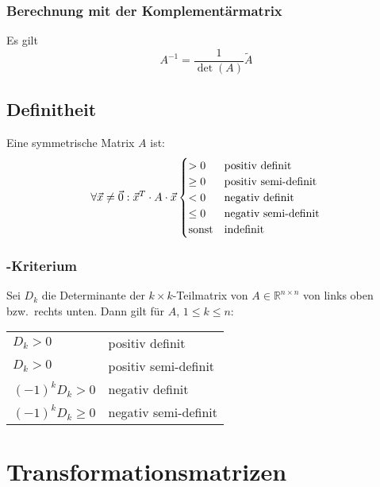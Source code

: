 \subsubsection[Komplementärmatrix]{Berechnung mit der Komplementärmatrix}

Es gilt \[ A^{-1} = \frac{1}{\det(A)}\tilde{A} \]


\subsection{Definitheit}

Eine symmetrische Matrix $A$ ist:
\[
  \forall\vec{x}\neq\vec{0}:\vec{x}^{T}\cdot A\cdot\vec{x} \begin{cases}
  	>    0       & \hbox{positiv definit}      \\
  	\geq 0       & \hbox{positiv semi-definit} \\
  	<    0       & \hbox{negativ definit}      \\
  	\leq 0       & \hbox{negativ semi-definit} \\
  	\hbox{sonst} & \hbox{indefinit}
  \end{cases}
\]

\subsubsection{\label{sub:Hurwitz-Kriterium}\protect{}-Kriterium}

Sei $D_k$ die Determinante der $k\times k$-Teilmatrix von $A \in \mathbb{R}^{n \times n}$ von links oben bzw.~rechts unten.
Dann gilt für $A$, $1 \leq k \leq n $:
\begin{center}
    \begin{tabular}{ll}
    	$D_k>0$           & positiv definit      \\
    	$D_k>0$           & positiv semi-definit \\
    	$(-1)^k D_k>0$    & negativ definit      \\
    	$(-1)^k D_k\geq0$ & negativ semi-definit
    \end{tabular}
\end{center}
\fi


\section{Transformationsmatrizen}

